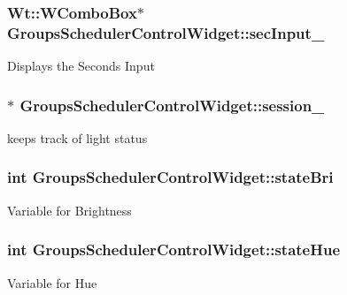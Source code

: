 \subsubsection[{\texorpdfstring{sec\+Input\+\_\+}{secInput_}}]{\setlength{\rightskip}{0pt plus 5cm}Wt\+::\+W\+Combo\+Box$\ast$ Groups\+Scheduler\+Control\+Widget\+::sec\+Input\+\_\+\hspace{0.3cm}{\ttfamily [private]}}\hypertarget{classGroupsSchedulerControlWidget_a54ea49b4871569d66a9648013fa75d29}{}\label{classGroupsSchedulerControlWidget_a54ea49b4871569d66a9648013fa75d29}
Displays the Seconds Input 
\subsubsection[{\texorpdfstring{session\+\_\+}{session_}}]{$\ast$ Groups\+Scheduler\+Control\+Widget\+::session\+\_\+\hspace{0.3cm}{\ttfamily [private]}}\hypertarget{classGroupsSchedulerControlWidget_a3deffc645d7f353f13f92d24c65618e0}{}\label{classGroupsSchedulerControlWidget_a3deffc645d7f353f13f92d24c65618e0}
keeps track of light status 
\subsubsection[{\texorpdfstring{state\+Bri}{stateBri}}]{\setlength{\rightskip}{0pt plus 5cm}int Groups\+Scheduler\+Control\+Widget\+::state\+Bri\hspace{0.3cm}{\ttfamily [private]}}\hypertarget{classGroupsSchedulerControlWidget_a7b3e5bbcd29fc34ddb8a765481f7d546}{}\label{classGroupsSchedulerControlWidget_a7b3e5bbcd29fc34ddb8a765481f7d546}
Variable for Brightness 
\subsubsection[{\texorpdfstring{state\+Hue}{stateHue}}]{\setlength{\rightskip}{0pt plus 5cm}int Groups\+Scheduler\+Control\+Widget\+::state\+Hue\hspace{0.3cm}{\ttfamily [private]}}\hypertarget{classGroupsSchedulerControlWidget_a36d88417d53236de62a7b0c43c12ba15}{}\label{classGroupsSchedulerControlWidget_a36d88417d53236de62a7b0c43c12ba15}
Variable for Hue 
